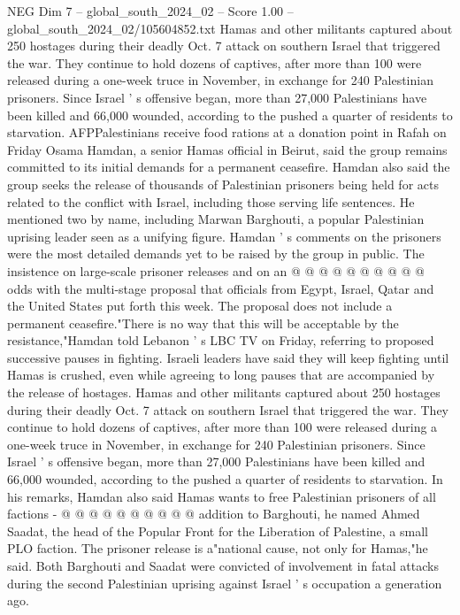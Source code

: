 \begin{textsample}{NEG Dim 7 – global\_south\_2024\_02 – Score 1.00 – global\_south\_2024\_02/105604852.txt}  \label{ex:f7_neg_256}
Hamas and other militants captured about 250 hostages during their deadly Oct. 7 attack on southern Israel that triggered the war.
They continue to hold dozens of captives, after more than 100 were released during a one-week truce in November, in exchange for 240 Palestinian prisoners.
Since Israel ' s offensive began, more than 27,000 Palestinians have been killed and 66,000 wounded, according to the pushed a quarter of residents to starvation.
AFPPalestinians receive food rations at a donation point in Rafah on Friday Osama Hamdan, a senior Hamas official in Beirut, said the group remains committed to its initial demands for a permanent ceasefire.
Hamdan also said the group seeks the release of thousands of Palestinian prisoners being held for acts related to the conflict with Israel, including those serving life sentences.
He mentioned two by name, including Marwan Barghouti, a popular Palestinian uprising leader seen as a unifying figure.
Hamdan ' s comments on the prisoners were the most detailed demands yet to be raised by the group in public.
The insistence on large-scale prisoner releases and on an @ @ @ @ @ @ @ @ @ @ odds with the multi-stage proposal that officials from Egypt, Israel, Qatar and the United States put forth this week.
The proposal does not include a permanent ceasefire."There is no way that this will be acceptable by the resistance,"Hamdan told Lebanon ' s LBC TV on Friday, referring to proposed successive pauses in fighting.
Israeli leaders have said they will keep fighting until Hamas is crushed, even while agreeing to long pauses that are accompanied by the release of hostages.
Hamas and other militants captured about 250 hostages during their deadly Oct. 7 attack on southern Israel that triggered the war.
They continue to hold dozens of captives, after more than 100 were released during a one-week truce in November, in exchange for 240 Palestinian prisoners.
Since Israel ' s offensive began, more than 27,000 Palestinians have been killed and 66,000 wounded, according to the pushed a quarter of residents to starvation.
In his remarks, Hamdan also said Hamas wants to free Palestinian prisoners of all factions - @ @ @ @ @ @ @ @ @ @ addition to Barghouti, he named Ahmed Saadat, the head of the Popular Front for the Liberation of Palestine, a small PLO faction.
The prisoner release is a"national cause, not only for Hamas,"he said.
Both Barghouti and Saadat were convicted of involvement in fatal attacks during the second Palestinian uprising against Israel ' s occupation a generation ago.

\end{textsample}
